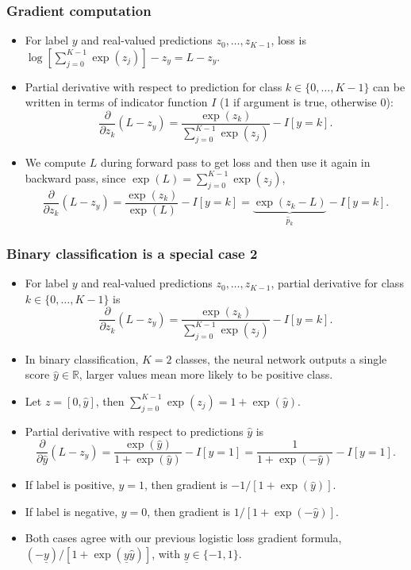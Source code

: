 \documentclass{beamer}
\begin{document}
\begin{frame}
  \frametitle{Gradient computation}
  \begin{itemize}
  \item For label $y$ and real-valued predictions $z_0,\dots,z_{K-1}$, loss is
$
\log
\left[
\sum_{j=0}^{K-1}  \exp(z_j) 
\right]
-z_y= L-z_y.
$
\item Partial derivative with respect to prediction for class
  $k\in\{0,\dots,K-1\}$ can be written in terms of indicator function
  $I$ (1 if argument is true, otherwise 0):
$$
\frac{\partial}{\partial z_k}
\left(L-z_y\right) = 
\frac{\exp(z_k)}{\sum_{j=0}^{K-1}\exp(z_j)}
-I[y=k].
$$
\item We compute $L$ during forward pass to get loss and then use it
  again in backward pass, since $\exp(L)=\sum_{j=0}^{K-1}\exp(z_j)$,
$$
\frac{\partial}{\partial z_k}
\left(L-z_y\right) = 
\frac{\exp(z_k)}{\exp(L)}
-I[y=k]
=
\underbrace{\exp(z_k-L)}_{\hat p_k}
-I[y=k].
$$
\end{itemize}
\end{frame}

\begin{frame}
  \frametitle{Binary classification is a special case 2}
  \begin{itemize}
  \item For label $y$ and real-valued predictions $z_0,\dots,z_{K-1}$,
    partial derivative for class $k\in\{0,\dots,K-1\}$ is 
$$
\frac{\partial}{\partial z_k}
\left(L-z_y\right) = 
\frac{\exp(z_k)}{\sum_{j=0}^{K-1}\exp(z_j)}
-I[y=k].
$$
\item In binary classification, $K=2$ classes, the neural network
  outputs a single score $\hat y\in\mathbb R$, larger values mean more
  likely to be positive class.
\item Let $z=[0,\hat y]$, then $\sum_{j=0}^{K-1} \exp(z_j) = 1+\exp(\hat y)$.
\item Partial derivative with respect to predictions $\hat y$ is
$$
\frac{\partial}{\partial \hat y}
\left(L-z_y\right) 
= 
\frac{\exp(\hat y)}{1+\exp(\hat y)}
-I[y=1]
= 
\frac{1}{1+\exp(-\hat y)}
-I[y=1].
$$
\item If label is positive, $y=1$, then gradient is 
$-1/[1+\exp(\hat y)]$.
\item If label is negative, $y=0$, then gradient is
$1/[1+\exp(-\hat y)]$.
\item Both cases agree with our previous logistic loss gradient formula,
  $(-\underline y)/[1+\exp(\underline y \hat y)]$, with $\underline y\in\{-1,1\}$.
\end{itemize}
\end{frame}
\end{document}
